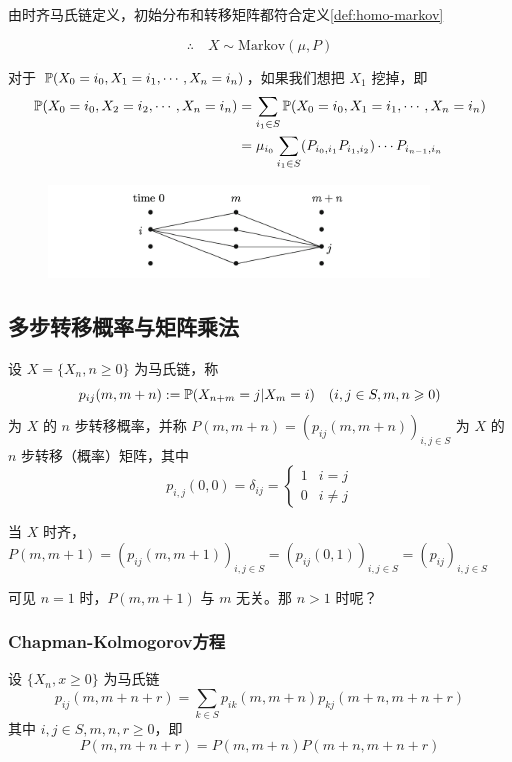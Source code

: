 由时齐马氏链定义，初始分布和转移矩阵都符合定义\ref{def:homo-markov}

\[
\therefore \quad X\sim \text{Markov}(\mu,P)
\]

对于 $\mathbb{P}(X_0=i_0,X_1=i_1,\cdots,X_{n}=i_{n})$，如果我们想把 $X_1$ 挖掉，即
\[
\begin{aligned}
    \mathbb{P}(X_0=i_0,X_2=i_2,\cdots,X_{n}=i_{n})&=\sum_{i_1\in S}\mathbb{P}(X_0=i_0,X_1=i_1,\cdots,X_{n}=i_{n})\\
    &=\mu_{i_0}\sum_{i_1\in S}(P_{i_0,i_1}P_{i_1,i_2})\cdots P_{i_{n-1},i_n}
\end{aligned}
\]

\begin{figure}[H]
    \centering
    \includegraphics[width=0.9\textwidth]{figures/split_steps.png}
\end{figure}

\subsection{多步转移概率与矩阵乘法}

\begin{definition}
    设 $X=\{X_n,n\geq 0\}$ 为马氏链，称
    \[
    p_{ij}(m,m+n):=\mathbb{P}(X_{n+m}=j|X_m=i)\quad (i,j\in S, m,n\geqslant 0)
    \]
    为 $X$ 的 $n$ 步转移概率，并称 $P(m,m+n)=(p_{ij}(m,m+n))_{i,j\in S}$ 为 $X$ 的 $n$ 步转移（概率）矩阵，其中
    \[
    p_{i,j}(0,0)=\delta_{ij}=\begin{cases}
        1 & i=j\\
        0 & i\neq j
    \end{cases}
    \]
\end{definition}

当 $X$ 时齐，$P(m,m+1)=(p_{ij}(m,m+1))_{i,j\in S}=(p_{ij}(0,1))_{i,j\in S}=(p_{ij})_{i,j\in S}$

可见 $n=1$ 时，$P(m,m+1)$ 与 $m$ 无关。那 $n>1$ 时呢？

\subsubsection{Chapman-Kolmogorov方程}

\begin{theorem}[C-K方程]
    设 $\{X_n,x\geq 0\}$ 为马氏链
    \[
    p_{ij}(m,m+n+r)=\sum_{k\in S}p_{ik}(m,m+n)p_{kj}(m+n,m+n+r)
    \]
    其中 $i,j\in S,m,n,r\geq 0$，即
    \[
    P(m,m+n+r)=P(m,m+n)P(m+n,m+n+r)
    \]
\end{theorem}

